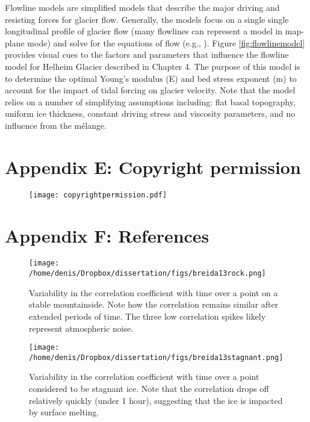 Flowline models are simplified models that describe the major driving and resisting forces for glacier flow. Generally, the models focus on a single single longitudinal profile of glacier flow (many flowlines can represent a model in map-plane mode) and solve for the equations of flow (e.g., \citet{nick2006dynamics,nick2010physically,walker2012viscoelastic,walker2014ice}). Figure \ref{fig:flowlinemodel} provides visual cues to the factors and parameters that influence the flowline model for Helheim Glacier described in Chapter 4. The purpose of this model is to determine the optimal Young's modulus (E) and bed stress exponent (m) to account for the impact of tidal forcing on glacier velocity. Note that the model relies on a number of simplifying assumptions including: flat basal topography, uniform ice thickness, constant driving stress and viscosity parameters, and no influence from the m\'elange. 

\newpage
\section*{Appendix E: Copyright permission}
\begin{figure}[h!]
\centering
\texttt{[image: copyrightpermission.pdf]}
\end{figure}

\newpage
\section*{Appendix F: References}





\newpage

\begin{figure}
\centering
\texttt{[image: /home/denis/Dropbox/dissertation/figs/breida13rock.png]}
\caption[Variability in the correlation coefficient with time over a point on a stable mountainside.]{Variability in the correlation coefficient with time over a point on a stable mountainside. Note how the correlation remains similar after extended periods of time. The three low correlation spikes likely represent atmospheric noise.}
\label{fig:ccmountain}
\end{figure}

\begin{figure}
\centering
\texttt{[image: /home/denis/Dropbox/dissertation/figs/breida13stagnant.png]}
\caption[Variability in the correlation coefficient with time over a point considered to be stagnant ice.]{Variability in the correlation coefficient with time over a point considered to be stagnant ice. Note that the correlation drops off relatively quickly (under 1 hour), suggesting that the ice is impacted by surface melting.}
\label{fig:ccstagnant}
\end{figure}



